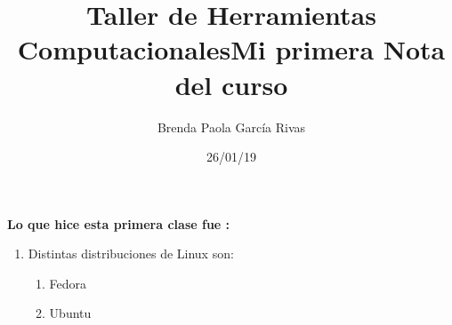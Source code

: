 \documentclass[letterpaper, 12pt, oneside]{article}%
\title{\Huge Taller de Herramientas Computacionales}
\author{Brenda Paola García Rivas}
\date{26/01/19}
\begin{document}
	\maketitle
	\newpage
	
	\title{\Huge Mi primera Nota del curso\\}
	
	\textbf{Lo que hice esta primera clase fue :}
	
	\begin{enumerate}
		\item Distintas distribuciones de Linux son:
		\begin{enumerate}
			\item Fedora
			\item Ubuntu
		\end{enumerate}
		
	\end{enumerate}
\end{document}
